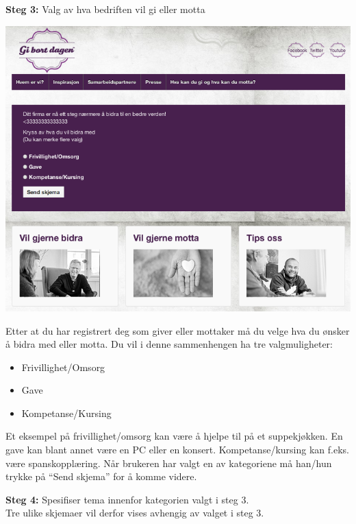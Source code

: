 {\bf Steg 3:} Valg av hva bedriften vil gi eller motta
\begin{center}
\includegraphics[clip=true, width=1 \textwidth,
trim=0cm 0cm 0cm 0cm]{valg1.png}
\label{fig:bidra}
\end{center}

Etter at du har registrert deg som giver eller mottaker må du velge hva du ønsker å bidra med eller motta. Du vil i denne sammenhengen ha tre valgmuligheter:\\

\begin{itemize}
    \item Frivillighet/Omsorg
    \item Gave
    \item Kompetanse/Kursing
\end{itemize}
Et eksempel på frivillighet/omsorg kan være å hjelpe til på et suppekjøkken. En gave kan blant annet være en PC eller en konsert. Kompetanse/kursing kan f.eks. være spanskopplæring. Når brukeren har valgt en av kategoriene må han/hun trykke på ``Send skjema'' for å komme videre.\\

\newpage

{\bf Steg 4:} Spesifiser tema innenfor kategorien valgt i steg 3.\\
Tre ulike skjemaer vil derfor vises avhengig av valget i steg 3.\\

